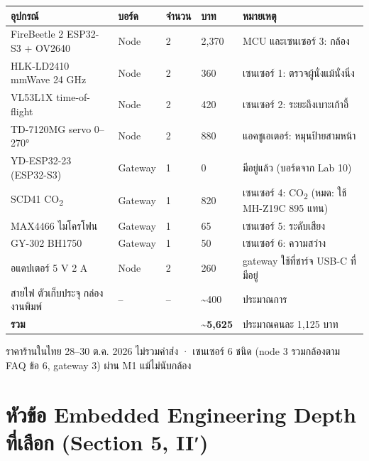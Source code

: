 \documentclass[a4paper,11pt]{article}
\begin{document}
{\footnotesize
\begin{tabularx}{\linewidth}{@{}P{5.6cm}P{1.4cm}R{0.95cm}R{1.2cm}L@{}}
\toprule
\textbf{อุปกรณ์} & \textbf{บอร์ด} & \textbf{จำนวน} & \textbf{บาท} & \textbf{หมายเหตุ} \\
\midrule
FireBeetle 2 ESP32-S3 + OV2640 & Node & 2 & 2,370 & MCU และเซนเซอร์ 3: กล้อง \\
HLK-LD2410 mmWave 24 GHz & Node & 2 & 360 & เซนเซอร์ 1: ตรวจผู้นั่งแม้นั่งนิ่ง \\
VL53L1X time-of-flight & Node & 2 & 420 & เซนเซอร์ 2: ระยะถึงเบาะเก้าอี้ \\
TD-7120MG servo 0--270° & Node & 2 & 880 & แอคชูเอเตอร์: หมุนป้ายสามหน้า \\
YD-ESP32-23 (ESP32-S3) & Gateway & 1 & 0 & มีอยู่แล้ว (บอร์ดจาก Lab 10) \\
SCD41 CO\textsubscript{2} & Gateway & 1 & 820 & เซนเซอร์ 4: CO\textsubscript{2} (หมด: ใช้ MH-Z19C 895 แทน) \\
MAX4466 ไมโครโฟน & Gateway & 1 & 65 & เซนเซอร์ 5: ระดับเสียง \\
GY-302 BH1750 & Gateway & 1 & 50 & เซนเซอร์ 6: ความสว่าง \\
อแดปเตอร์ 5 V 2 A & Node & 2 & 260 & gateway ใช้ที่ชาร์จ USB-C ที่มีอยู่ \\
สายไฟ ตัวเก็บประจุ กล่อง งานพิมพ์ & -- & -- & \textasciitilde 400 & ประมาณการ \\
\midrule
\textbf{รวม} & & & \textbf{\textasciitilde 5,625} & ประมาณคนละ 1,125 บาท \\
\bottomrule
\end{tabularx}}

{\scriptsize\color{muted} ราคาร้านในไทย 28--30 ต.ค. 2026 ไม่รวมค่าส่ง · เซนเซอร์ 6 ชนิด (node 3 รวมกล้องตาม FAQ ข้อ 6, gateway 3) ผ่าน M1 แม้ไม่นับกล้อง}

\section{หัวข้อ Embedded Engineering Depth ที่เลือก (Section 5, II′)}
\end{document}
